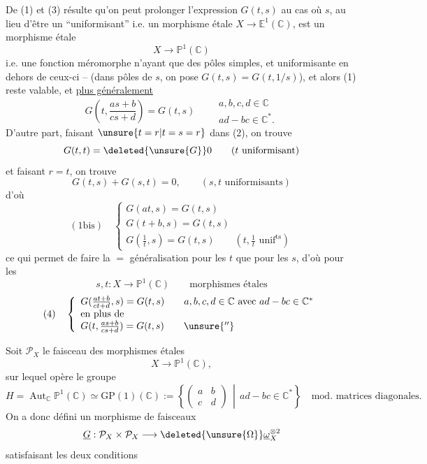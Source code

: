 De (1)  et (3) résulte qu'on peut prolonger l'expression $G(t,s)$ au cas où $s$, au lieu d'être un ``uniformisant'' i.e. un morphisme étale $X\longrightarrow\mathbb E^1(\mathbb C)$, est un morphisme étale
\[
X\longrightarrow\mathbb P^1(\mathbb C)
\]
i.e. une fonction méromorphe n'ayant que des pôles simples, et uniformisante en dehors de ceux-ci -- (dans  pôles de $s$, on pose $G(t,s)=G(t,1/s)$), et alors  (1)  reste valable, et \uline{plus généralement}
\[
G\left(t,\frac{as+b}{cs+d}\right)=G(t,s)\qquad
\begin{gathered}a,b,c,d\in\mathbb C\\ad-bc\in\mathbb C^*.\end{gathered}
\]
D'autre part, faisant $\unsure{t=r|t=s=r}$ dans (2), on trouve
\[
G(t,t)=\deleted{\unsure{G}}0\qquad(t\text{ uniformisant})
\]
et faisant $r=t$, on trouve
\[
G(t,s)+G(s,t)=0,\qquad(s,t\text{ uniformisants})
\]
d'où
\[
(1\mathrm{bis})\quad\left\{\begin{array}{l}
G(at,s)=G(t,s)\\
G(t+b,s)=G(t,s)\\
G(\frac1t,s)=G(t,s)\qquad(t,\frac1t\text{ unif}^{\mathrm{ts}})
\end{array}\right.
\]
ce qui permet de faire la $=$ généralisation pour les $t$ que pour les $s$, d'où pour les
\[
s,t:X\longrightarrow\mathbb P^1(\mathbb C)\qquad\text{morphismes étales}
\]
\[
(4)\quad\left\{\begin{array}{l}
G(\frac{at+b}{ct+d},s)=G(t,s)\qquad a,b,c,d\in\mathbb C\text{ avec }ad-bc\in\mathbb C^*\\
\text{en plus de}\\
G(t,\frac{as+b}{cs+d})=G(t,s)\qquad\unsure{''}
\end{array}\right.
\]

Soit $\mathcal P_X$ le faisceau des morphismes  étales
\[
X\longrightarrow\mathbb P^1(\mathbb C),
\]
sur lequel opère le groupe
\[
H=\operatorname{Aut}_{\mathbb C}\mathbb P^1(\mathbb C)\simeq\mathrm{GP}(1)(\mathbb C):=\left\{\left(\begin{matrix}a&b\\c&d\end{matrix}\right)\,\middle|\,ad-bc\in\mathbb C^*\right\}\quad\text{mod. matrices diagonales}.
\]
On a donc défini un morphisme de faisceaux
\[
\underline G:\mathcal P_X\times\mathcal P_X\longrightarrow\deleted{\unsure{\Omega}}\underline\omega_X^{\otimes2}
\]
satisfaisant les deux conditions

